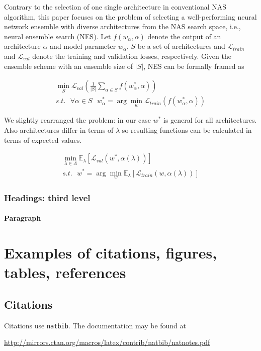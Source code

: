 \documentclass{article}
\begin{document}
Contrary to the selection of one single architecture in conventional NAS algorithm, this paper focuses on the problem of selecting a well-performing neural network ensemble with diverse architectures from the NAS search space, i.e., neural ensemble search (NES). Let $f(w_\alpha, \alpha)$ denote the output of an architecture $\alpha$ and model parameter $w_\alpha$, $S$ be a set of architectures and $\mathcal{L}_{train}$ and $\mathcal{L}_{val}$ denote the training and validation losses, respectively. Given the ensemble scheme with an ensemble size of $|S|$, NES can be formally framed as

\begin{gather*}
	\min_S \mathcal{L}_{val}\left(\frac{1}{|S|}\sum_{\alpha \in S}f(w_\alpha^*, \alpha)\right) \\
s.t. \text{ }\forall \alpha \in S \text{ } w_\alpha^* = \arg \min_w \mathcal{L}_{train}(f(w_\alpha^*, \alpha))
\end{gather*}

We slightly rearranged the problem: in our case $w^*$ is general for all architectures. Also architectures differ in terms of $\lambda$ so resulting functions can be calculated in terms of expected values.

\begin{gather*}
    \min_{\lambda \in \Lambda} \mathbb{E}_\lambda [\mathcal{L}_{val}(w^*, \alpha(\lambda))] \\
    s.t. \text{ } w^* = \arg \min_w \mathbb{E}_\lambda[\mathcal{L}_{train}(w, \alpha(\lambda))]
\end{gather*}

\subsubsection{Headings: third level}
\lipsum[6]

\paragraph{Paragraph}
\lipsum[7]



\section{Examples of citations, figures, tables, references}
\label{sec:others}

\subsection{Citations}
Citations use \verb+natbib+. The documentation may be found at
\begin{center}
	\url{http://mirrors.ctan.org/macros/latex/contrib/natbib/natnotes.pdf}
\end{center}
\end{document}
